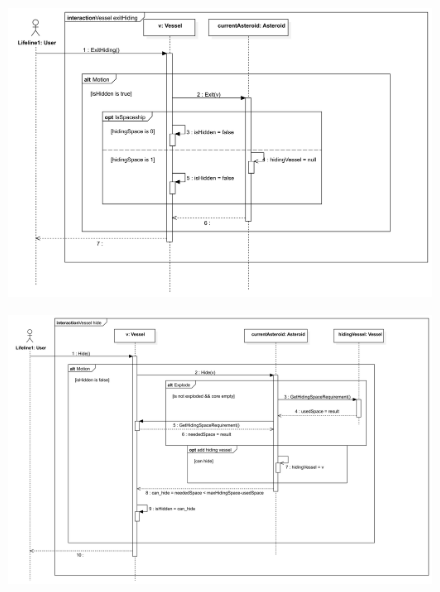 \documentclass[../../projlab]{subfiles}
\begin{document}
\begin{figure}[H]
	\includegraphics[width=1\textwidth]{docs/2_Project/svg/Design Model!Vessel Actions!Vessel exitHiding!Vessel exitHiding_12.png}
	\centering
\end{figure}

\begin{figure}[H]
	\includegraphics[width=1\textwidth]{docs/2_Project/svg/Design Model!Vessel Actions!Vessel hide!Vessel hide_11.png}
	\centering
\end{figure}
\end{document}
